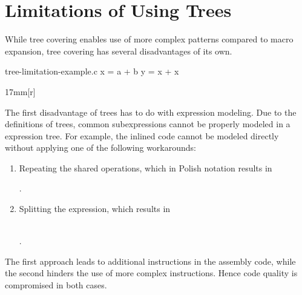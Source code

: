 \section{Limitations of Using Trees}

While \gls{tree covering} enables use of more complex \glspl{pattern} compared
to \gls{macro expansion}, \gls{tree covering} has several disadvantages of its
own.

\begin{filecontents*}{tree-limitation-example.c}
x = a + b
y = x + x
\end{filecontents*}
%
\begin{inParFigure}{17mm}[r]
  \centering

  \vspace{1.25\baselineskip}

  \begin{lstpage}{\linewidth}%
  \end{lstpage}%
\end{inParFigure}%
%
The first disadvantage of \glspl{tree} has to do with expression modeling.
%
Due to the definitions of \glspl{tree}, common subexpressions cannot be properly
modeled in a \gls{expression tree}.
%
For example, the inlined code cannot be modeled directly without applying one of
the following workarounds:
%
\begin{enumerate}
  \item Repeating the shared operations, which in \gls{Polish notation} results
    in
    \begin{center}
      .
    \end{center}
  \item Splitting the expression, which results in
    \begin{center}
      \\
      .
    \end{center}
\end{enumerate}


\noindent
The first approach leads to additional \glspl{instruction} in the \gls{assembly
  code}, while the second hinders the use of more complex \glspl{instruction}.
%
Hence code quality is compromised in both cases.

